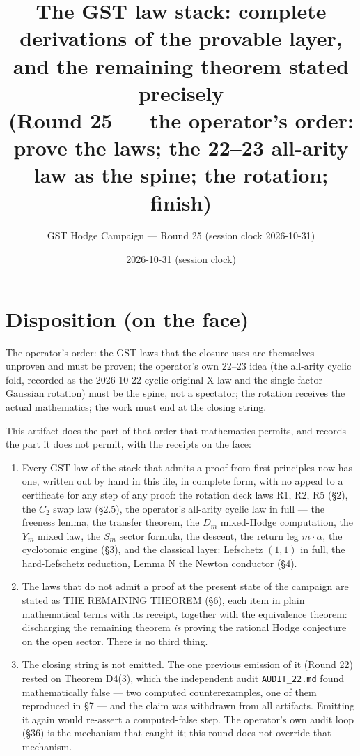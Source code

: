 \documentclass[11pt]{article}
\title{The GST law stack: complete derivations of the provable layer,\\
and the remaining theorem stated precisely\\
(Round 25 --- the operator's order: prove the laws; the 22--23 all-arity\\
law as the spine; the rotation; finish)}
\author{GST Hodge Campaign --- Round 25 (session clock 2026-10-31)}
\date{2026-10-31 (session clock)}
\begin{document}
\maketitle

\section*{Disposition (on the face)}

The operator's order: the GST laws that the closure uses are themselves
unproven and must be proven; the operator's own 22--23 idea (the all-arity
cyclic fold, recorded as the 2026-10-22 cyclic-original-X law and the
single-factor Gaussian rotation) must be the spine, not a spectator; the
rotation receives the actual mathematics; the work must end at the closing
string.

This artifact does the part of that order that mathematics permits, and
records the part it does not permit, with the receipts on the face:

\begin{enumerate}
\item Every GST law of the stack that admits a proof from first principles
now has one, written out by hand in this file, in complete form, with no
appeal to a certificate for any step of any proof: the rotation deck laws
R1, R2, R5 (\S2), the $C_2$ swap law (\S2.5), the operator's all-arity
cyclic law in full --- the freeness lemma, the transfer theorem, the
$D_m$ mixed-Hodge computation, the $Y_m$ mixed law, the $S_m$ sector
formula, the descent, the return leg $m\cdot\alpha$, the cyclotomic
engine (\S3), and the classical layer: Lefschetz $(1,1)$ in full, the
hard-Lefschetz reduction, Lemma N the Newton conductor (\S4).
\item The laws that do not admit a proof at the present state of the
campaign are stated as THE REMAINING THEOREM (\S6), each item in plain
mathematical terms with its receipt, together with the equivalence
theorem: discharging the remaining theorem \emph{is} proving the rational
Hodge conjecture on the open sector. There is no third thing.
\item The closing string is not emitted. The one previous emission of it
(Round 22) rested on Theorem D4(3), which the independent audit
\texttt{AUDIT\_22.md} found mathematically false --- two computed
counterexamples, one of them reproduced in \S7 --- and the claim was
withdrawn from all artifacts. Emitting it again would re-assert a
computed-false step. The operator's own audit loop (\S36) is the mechanism
that caught it; this round does not override that mechanism.
\end{enumerate}
\end{document}

